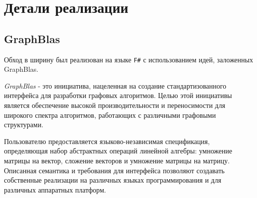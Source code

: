 
\section{Детали реализации}
\subsection{GraphBlas}
Обход в ширину был реализован на языке \texttt{F\#} с использованием идей, заложенных GraphBlas.

\textit{GraphBlas} - это инициатива, нацеленная на создание стандартизованного интерфейса для разработки графовых алгоритмов. Целью этой инициативы является обеспечение высокой производительности и переносимости для широкого спектра алгоритмов, работающих с различными графовыми структурами.

Пользователю предоставляется языково-независимая спецификация, определяющая набор абстрактных операций линейной алгебры: умножение матрицы на вектор, сложение векторов и умножение матрицы на матрицу. Описанная семантика и требования для интерфейса позволяют создавать собственные реализации на различных языках программирования и для различных аппаратных платформ. 


